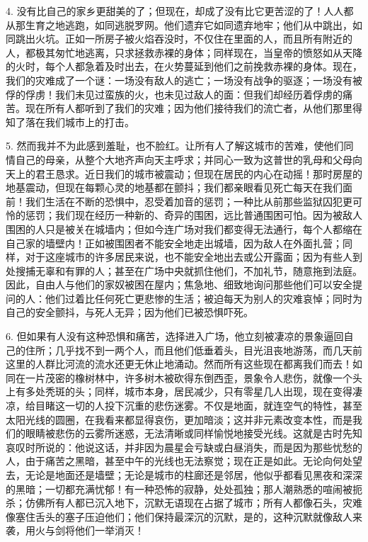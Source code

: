 4. 没有比自己的家乡更甜美的了；但现在，却成了没有比它更苦涩的了！人人都从那生育之地逃跑，如同逃脱罗网。他们遗弃它如同遗弃地牢；他们从中跳出，如同跳出火坑。正如一所房子被火焰吞没时，不仅住在里面的人，而且所有附近的人，都极其匆忙地逃离，只求拯救赤裸的身体；同样现在，当皇帝的愤怒如从天降的火时，每个人都急着及时出去，在火势蔓延到他们之前挽救赤裸的身体。现在，我们的灾难成了一个谜：一场没有敌人的逃亡；一场没有战争的驱逐；一场没有被俘的俘虏！我们未见过蛮族的火，也未见过敌人的面：但我们却经历着俘虏的痛苦。现在所有人都听到了我们的灾难；因为他们接待我们的流亡者，从他们那里得知了落在我们城市上的打击。\par

5. 然而我并不为此感到羞耻，也不脸红。让所有人了解这城市的苦难，使他们同情自己的母亲，从整个大地齐声向天主呼求；并同心一致为这普世的乳母和父母向天上的君王恳求。近日我们的城市被震动；但现在居民的内心在动摇！那时房屋的地基震动，但现在每颗心灵的地基都在颤抖；我们都亲眼看见死亡每天在我们面前！我们生活在不断的恐惧中，忍受着加音的惩罚；一种比从前那些监狱囚犯更可怜的惩罚；我们现在经历一种新的、奇异的围困，远比普通围困可怕。因为被敌人围困的人只是被关在城墙内；但如今连广场对我们都变得无法通行，每个人都缩在自己家的墙壁内！正如被围困者不能安全地走出城墙，因为敌人在外面扎营；同样，对于这座城市的许多居民来说，也不能安全地出去或公开露面；因为有些人到处搜捕无辜和有罪的人；甚至在广场中央就抓住他们，不加礼节，随意拖到法庭。因此，自由人与他们的家奴被困在屋内；焦急地、细致地询问那些他们可以安全提问的人：他们过着比任何死亡更悲惨的生活；被迫每天为别人的灾难哀悼；同时为自己的安全颤抖，与死人无异；因为他们已被恐惧吓死。\par

6. 但如果有人没有这种恐惧和痛苦，选择进入广场，他立刻被凄凉的景象逼回自己的住所；几乎找不到一两个人，而且他们低垂着头，目光沮丧地游荡，而几天前这里的人群比河流的流水还更无休止地涌动。然而所有这些现在都离我们而去！如同在一片茂密的橡树林中，许多树木被砍得东倒西歪，景象令人悲伤，就像一个头上有多处秃斑的头；同样，城市本身，居民减少，只有零星几人出现，现在变得凄凉，给目睹这一切的人投下沉重的悲伤迷雾。不仅是地面，就连空气的特性，甚至太阳光线的圆圈，在我看来都显得哀伤，更加暗淡；这并非元素改变本性，而是我们的眼睛被悲伤的云雾所迷惑，无法清晰或同样愉悦地接受光线。这就是古时先知哀叹时所说的：他说这话，并非因为晨星会亏缺或白昼消失，而是因为那些忧愁的人，由于痛苦之黑暗，甚至中午的光线也无法察觉；现在正是如此。无论向何处望去，无论是地面还是墙壁；无论是城市的柱廊还是邻居，他似乎都看见黑夜和深深的黑暗；一切都充满忧郁！有一种恐怖的寂静，处处孤独；那人潮熟悉的喧闹被扼杀；仿佛所有人都已沉入地下，沉默无语现在占据了城市；所有人都像石头，灾难像塞住舌头的塞子压迫他们；他们保持最深沉的沉默，是的，这种沉默就像敌人来袭，用火与剑将他们一举消灭！\par

